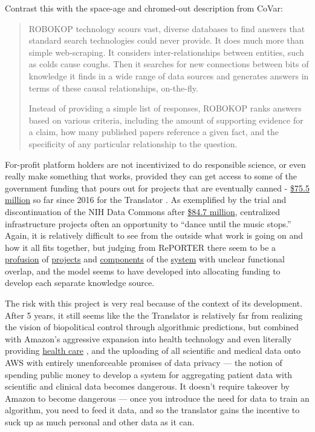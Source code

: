 \documentclass[10pt]{article}
\begin{document}
\begin{multicols}{2}
Contrast this with the space-age and chromed-out description from CoVar:

\begin{quote}
ROBOKOP technology scours vast, diverse databases to find answers that
standard search technologies could never provide. It does much more than
simple web-scraping. It considers inter-relationships between entities,
such as colds cause coughs. Then it searches for new connections between
bits of knowledge it finds in a wide range of data sources and generates
answers in terms of these causal relationships, on-the-fly.

Instead of providing a simple list of responses, ROBOKOP ranks answers
based on various criteria, including the amount of supporting evidence
for a claim, how many published papers reference a given fact, and the
specificity of any particular relationship to the question.
\end{quote}

For-profit platform holders are not incentivized to do responsible
science, or even really make something that works, provided they can get
access to some of the government funding that pours out for projects
that are eventually canned -
\href{https://reporter.nih.gov/search/kDJ97zGUFEaIBIltUmyd_Q/projects?sort_field=FiscalYear\&sort_order=desc}{\$75.5
million} so far since 2016 for the Translator \cite{RePORTRePORTERBiomedical2021} . As exemplified by the trial and
discontinuation of the NIH Data Commons after
\href{https://reporter.nih.gov/search/H4LxgMGK9kGw6SeWCom85Q/projects?shared=true}{\$84.7
million}, centralized infrastructure projects often an opportunity to
``dance until the music stops.'' Again, it is relatively difficult to
see from the outside what work is going on and how it all fits together,
but judging from RePORTER there seem to be a
\href{https://reporter.nih.gov/project-details/10332268}{profusion} of
\href{https://reporter.nih.gov/project-details/10333468}{projects} and
\href{https://reporter.nih.gov/project-details/10333460}{components} of
the \href{https://reporter.nih.gov/project-details/10330627}{system}
with unclear functional overlap, and the model seems to have developed
into allocating funding to develop each separate knowledge source.

The risk with this project is very real because of the context of its
development. After 5 years, it still seems like the the Translator is
relatively far from realizing the vision of biopolitical control through
algorithmic predictions, but combined with Amazon's aggressive expansion
into health technology \cite{AWSAnnouncesAWS2021}  and even
literally providing \href{https://amazon.care/}{health care} \cite{lermanAmazonBuiltIts2021} , and the uploading of all scientific and
medical data onto AWS with entirely unenforceable promises of data
privacy \cite{quinnYouCanTrust2021}  --- the notion of spending
public money to develop a system for aggregating patient data with
scientific and clinical data becomes dangerous. It doesn't require
takeover by Amazon to become dangerous --- once you introduce the need
for data to train an algorithm, you need to feed it data, and so the
translator gains the incentive to suck up as much personal and other
data as it can.


\end{multicols}
\end{document}
